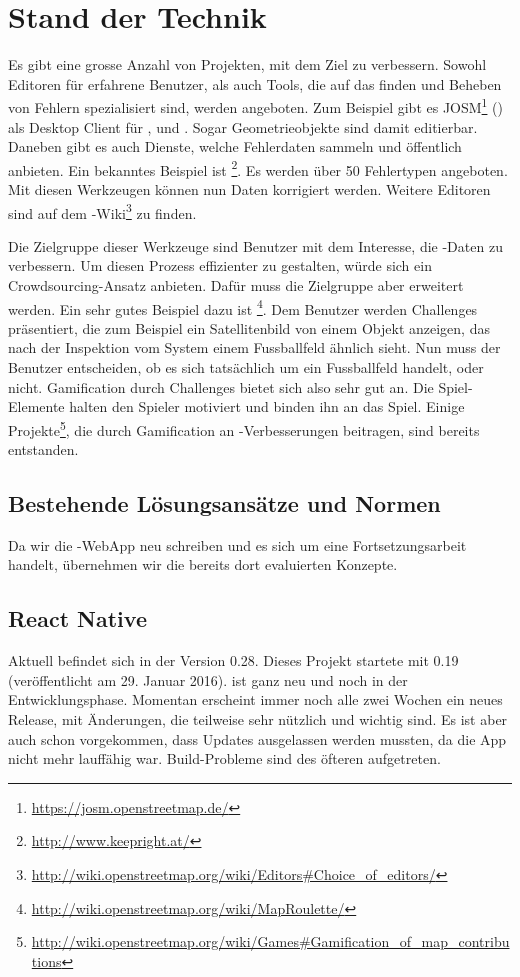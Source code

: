 \chapter{Stand der Technik}
\label{tb-stand-der-technik}
Es gibt eine grosse Anzahl von Projekten, mit dem Ziel  zu verbessern.
Sowohl Editoren für erfahrene Benutzer, als auch Tools, die auf das finden und Beheben von Fehlern spezialisiert sind, werden angeboten.
Zum Beispiel gibt es JOSM\footnote{\url{https://josm.openstreetmap.de/}} () als Desktop Client für ,  und .
Sogar Geometrieobjekte sind damit editierbar.
Daneben gibt es auch Dienste, welche Fehlerdaten sammeln und öffentlich anbieten.
Ein bekanntes Beispiel ist \footnote{\url{http://www.keepright.at/}}.
Es werden über 50 Fehlertypen angeboten.
Mit diesen Werkzeugen können nun Daten korrigiert werden.
Weitere Editoren sind auf dem -Wiki\footnote{\url{http://wiki.openstreetmap.org/wiki/Editors\#Choice_of_editors/}} zu finden.

Die Zielgruppe dieser Werkzeuge sind Benutzer mit dem Interesse, die -Daten zu verbessern.
Um diesen Prozess effizienter zu gestalten, würde sich ein \gls{Crowdsourcing}-Ansatz anbieten.
Dafür muss die Zielgruppe aber erweitert werden.
Ein sehr gutes Beispiel dazu ist \footnote{\url{http://wiki.openstreetmap.org/wiki/MapRoulette/}}.
Dem Benutzer werden Challenges präsentiert, die zum Beispiel ein Satellitenbild von einem Objekt anzeigen, das nach der Inspektion vom System einem Fussballfeld ähnlich sieht.
Nun muss der Benutzer entscheiden, ob es sich tatsächlich um ein Fussballfeld handelt, oder nicht.
\gls{Gamification} durch Challenges bietet sich also sehr gut an.
Die Spiel-Elemente halten den Spieler motiviert und binden ihn an das Spiel.
Einige Projekte\footnote{\url{http://wiki.openstreetmap.org/wiki/Games\#Gamification_of_map_contributions}}, die durch \gls{Gamification} an -Verbesserungen beitragen, sind bereits entstanden.\cite{ba-kort-2012}

\section{Bestehende Lösungsansätze und Normen}
Da wir die \kort{}-\gls{WebApp} neu schreiben und es sich um eine Fortsetzungsarbeit handelt, übernehmen wir die bereits dort evaluierten Konzepte.


\section{React Native}
Aktuell befindet sich  in der Version 0.28.
Dieses Projekt startete mit  0.19 (veröffentlicht am 29. Januar 2016).
 ist ganz neu und noch in der Entwicklungsphase.
Momentan erscheint immer noch alle zwei Wochen ein neues Release, mit Änderungen, die teilweise sehr nützlich und wichtig sind.
Es ist aber auch schon vorgekommen, dass Updates ausgelassen werden mussten, da die App nicht mehr lauffähig war.
Build-Probleme sind des öfteren aufgetreten.

